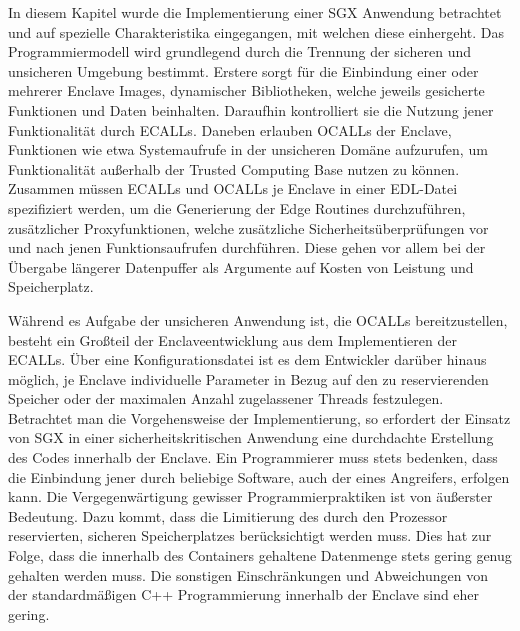 In diesem Kapitel wurde die Implementierung einer SGX Anwendung betrachtet und auf spezielle Charakteristika eingegangen, mit welchen diese einhergeht. Das Programmiermodell wird grundlegend durch die Trennung der sicheren und unsicheren Umgebung bestimmt. Erstere sorgt für die Einbindung einer oder mehrerer Enclave Images, dynamischer Bibliotheken, welche jeweils gesicherte Funktionen und Daten beinhalten. Daraufhin kontrolliert sie die Nutzung jener Funktionalität durch ECALLs. Daneben erlauben OCALLs der Enclave, Funktionen wie etwa Systemaufrufe in der unsicheren Domäne aufzurufen, um Funktionalität außerhalb der Trusted Computing Base nutzen zu können. Zusammen müssen ECALLs und OCALLs je Enclave in einer EDL-Datei spezifiziert werden, um die Generierung der Edge Routines durchzuführen, zusätzlicher Proxyfunktionen, welche zusätzliche Sicherheitsüberprüfungen vor und nach jenen Funktionsaufrufen durchführen. Diese gehen vor allem bei der Übergabe längerer Datenpuffer als Argumente auf Kosten von Leistung und Speicherplatz.

Während es Aufgabe der unsicheren Anwendung ist, die OCALLs bereitzustellen, besteht ein Großteil der Enclaveentwicklung aus dem Implementieren der ECALLs. Über eine Konfigurationsdatei ist es dem Entwickler darüber hinaus möglich, je Enclave individuelle Parameter in Bezug auf den zu reservierenden Speicher oder der maximalen Anzahl zugelassener Threads festzulegen. Betrachtet man die Vorgehensweise der Implementierung, so erfordert der Einsatz von SGX in einer sicherheitskritischen Anwendung eine durchdachte Erstellung des Codes innerhalb der Enclave. Ein Programmierer muss stets bedenken, dass die Einbindung jener durch beliebige Software, auch der eines Angreifers, erfolgen kann. Die Vergegenwärtigung gewisser Programmierpraktiken ist von äußerster Bedeutung. Dazu kommt, dass die Limitierung des durch den Prozessor reservierten, sicheren Speicherplatzes berücksichtigt werden muss. Dies hat zur Folge, dass die innerhalb des Containers gehaltene Datenmenge stets gering genug gehalten werden muss. Die sonstigen Einschränkungen und Abweichungen von der standardmäßigen C++ Programmierung innerhalb der Enclave sind eher gering.
